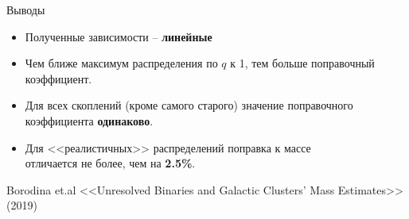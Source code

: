 \documentclass[pdf]{beamer}
\begin{document}
	\begin{frame}{Выводы}
		\begin{itemize}
			\item Полученные зависимости -- {\bf линейные}
			\item Чем ближе максимум распределения по $q$ к 1, тем больше поправочный коэффициент.
			\item Для всех скоплений (кроме самого старого) значение поправочного коэффициента {\bf одинаково}.
			\item Для <<реалистичных>> распределений поправка к массе\\ отличается не более, чем на {\bf 2.5\%}.
		\end{itemize}
		
	\vspace{2cm}

	{\footnotesize Borodina et.al  <<Unresolved Binaries and Galactic Clusters’ Mass Estimates>> (2019)}
	\end{frame}

	
\end{document}

